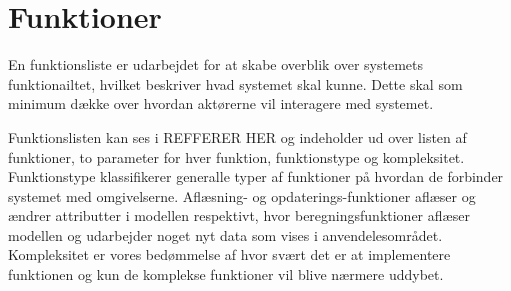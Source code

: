 \section{Funktioner}
\label{sec:funktioner}

En funktionsliste er udarbejdet for at skabe overblik over systemets funktionailtet, hvilket beskriver hvad systemet skal kunne. Dette skal som minimum dække over hvordan aktørerne vil interagere med systemet.

Funktionslisten kan ses i REFFERER HER og indeholder ud over listen af funktioner, to parameter for hver funktion, funktionstype og kompleksitet. Funktionstype klassifikerer generalle typer af funktioner på hvordan de forbinder systemet med omgivelserne. Aflæsning- og opdaterings-funktioner aflæser og ændrer attributter i modellen respektivt, hvor beregningsfunktioner aflæser modellen og udarbejder noget nyt data som vises i anvendelesområdet. Kompleksitet er vores bedømmelse af hvor svært det er at implementere funktionen og kun de komplekse funktioner vil blive nærmere uddybet.


